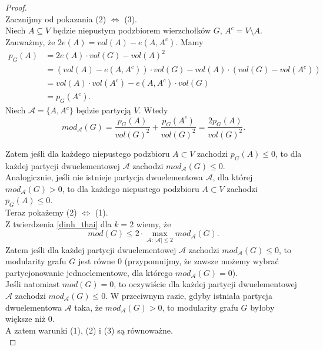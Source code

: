 \documentclass[letterpaper,12pt]{article}
\begin{document}
\begin{proof}
  \leavevmode\\
  \indent Zacznijmy od pokazania (2) \(\Leftrightarrow\) (3).\\

  \noindent Niech \(A \subseteq V\) będzie niepustym podzbiorem wierzchołków \(G\), \(A^c = V \setminus A\). Zauważmy, że \(2e(A) = vol(A) - e(A, A^c)\). Mamy
  \begin{align*}
    p_G(A) & = 2e(A) \cdot vol(G) - {vol(A)}^2                                                          \\
           & = \left(vol(A) - e(A, A^c)\right) \cdot vol(G) - vol(A) \cdot \left(vol(G)-vol(A^c)\right) \\
           & = vol(A) \cdot vol(A^c) - e(A, A^c) \cdot vol(G)                                           \\
           & = p_G(A^c).
  \end{align*}
  Niech \(\mathcal{A} = \{A, A^c\}\) będzie partycją \(V\). Wtedy
  \[mod_{\mathcal{A}}(G) = \frac{p_G(A)}{vol(G)^2} + \frac{p_G(A^c)}{vol(G)^2} = \frac{2p_G(A)}{vol(G)^2}.\]

  Zatem jeśli dla każdego niepustego podzbioru \(A \subset V\) zachodzi \(p_G(A) \leq 0\), to dla każdej partycji dwuelementowej \(\mathcal{A}\) zachodzi \(mod_{\mathcal{A}}(G) \leq 0\).\\
  Analogicznie, jeśli nie istnieje partycja dwuelementowa \(\mathcal{A}\), dla której \(mod_{\mathcal{A}}(G) > 0\), to dla każdego niepustego podzbioru \(A \subset V\) zachodzi \(p_G(A) \leq 0\).\\

  Teraz pokażemy (2) \(\Leftrightarrow\) (1).\\

  \noindent Z twierdzenia \ref{dinh_thai} dla \(k=2\) wiemy, że
  \[mod(G) \leq 2 \cdot \max_{\mathcal{A} : |\mathcal{A}| \leq 2} mod_{\mathcal{A}}(G).\]
  Zatem jeśli dla każdej partycji dwuelementowej \(\mathcal{A}\) zachodzi \(mod_{\mathcal{A}}(G) \leq 0\), to modularity grafu \(G\) jest równe 0 (przypomnijmy, że zawsze możemy wybrać partycjonowanie jednoelementowe, dla którego \(mod_{\mathcal{A}}(G) = 0\)).\\

  Jeśli natomiast \(mod(G) = 0\), to oczywiście dla każdej partycji dwuelementowej \(\mathcal{A}\) zachodzi \(mod_{\mathcal{A}}(G) \leq 0\). W przeciwnym razie, gdyby istniała partycja dwuelementowa \(\mathcal{A}\) taka, że \(mod_{\mathcal{A}}(G) > 0\), to modularity grafu \(G\) byłoby większe niż 0.\\

  A zatem warunki (1), (2) i (3) są równoważne.\\
\end{proof}
\end{document}
